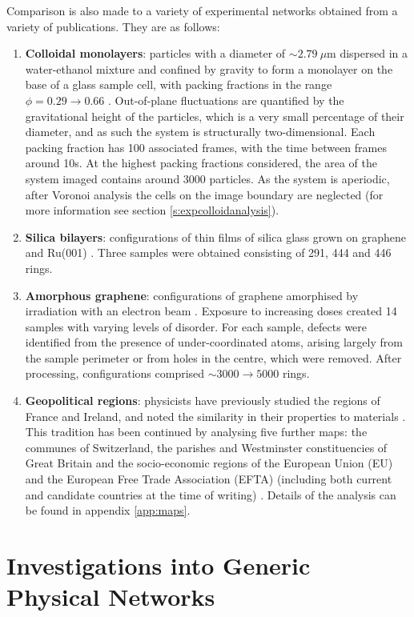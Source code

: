Comparison is also made to a variety of experimental networks obtained from a variety of publications.
They are as follows:
\begin{enumerate}
	\item \textbf{Colloidal monolayers}: particles with a diameter of $\sim 2.79~\mu$m dispersed in a water\--ethanol mixture and confined by gravity to form a monolayer on the base of a glass sample cell, with packing fractions in the range $\phi=0.29\rightarrow 0.66$ \cite{Thorneywork2017}.
Out\--of\--plane fluctuations are quantified by the gravitational height of the particles, which is a very small percentage of their diameter, and as such the system is structurally two-dimensional.
Each packing fraction has 100 associated frames, with the time between frames around 10s.
At the highest packing fractions considered, the area of the system imaged contains around 3000 particles.
As the system is aperiodic, after Voronoi analysis the cells on the image boundary are neglected (for more information see section \ref{s:expcolloidanalysis}).
\item \textbf{Silica bilayers}: configurations of thin films of silica glass grown on graphene \cite{Huang2012} and Ru(001) \cite{Buchner2017}.
Three samples were obtained consisting of 291, 444 and 446 rings.
\item \textbf{Amorphous graphene}: configurations of graphene amorphised by irradiation with an electron beam \cite{Eder2014}.
Exposure to increasing doses created 14 samples with varying levels of disorder.
For each sample, defects were identified from the presence of under\--coordinated atoms, arising largely from the sample perimeter or from holes in the centre, which were removed.
After processing, configurations comprised $\sim3000\rightarrow5000$ rings.
\item \textbf{Geopolitical regions}: physicists have previously studied the regions of France and Ireland, and noted the similarity in their properties to materials \cite{LeCaer1993,Okabe1992}.
This tradition has been continued by analysing five further maps: the communes of Switzerland, the parishes and Westminster constituencies of Great Britain and the socio\--economic regions of the European Union (EU) and the European Free Trade Association (EFTA) (including both current and candidate countries at the time of writing) \cite{osmap,chmap,eumap}. Details of the analysis can be found in appendix \ref{app:maps}.
\end{enumerate}

\section{Investigations into Generic Physical Networks}

